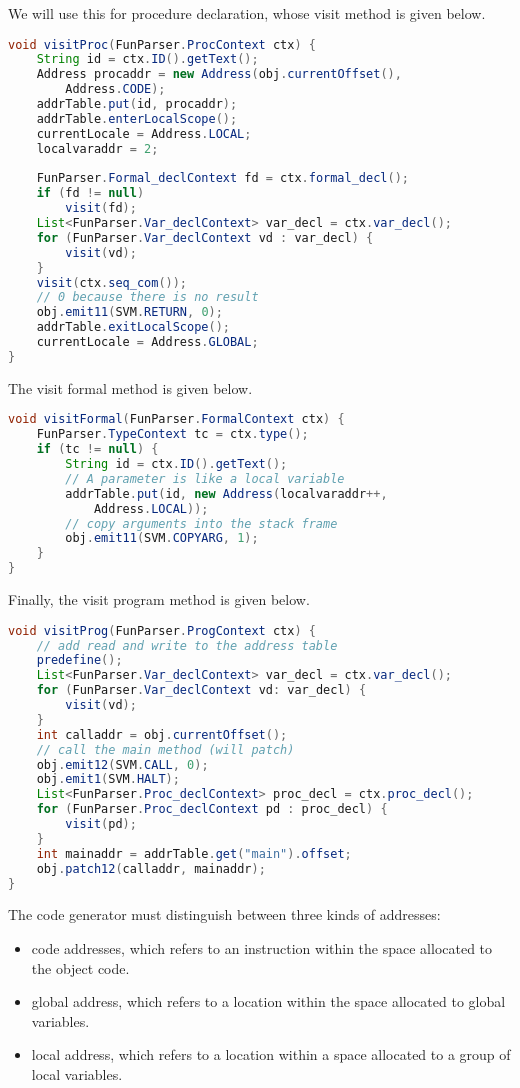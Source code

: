 \documentclass[a4paper, openany]{memoir}
\begin{document}
We will use this for procedure declaration, whose visit method is given below.
\begin{lstlisting}[language=java]
void visitProc(FunParser.ProcContext ctx) {
    String id = ctx.ID().getText();
    Address procaddr = new Address(obj.currentOffset(), 
        Address.CODE);
    addrTable.put(id, procaddr);
    addrTable.enterLocalScope();
    currentLocale = Address.LOCAL;
    localvaraddr = 2;
    
    FunParser.Formal_declContext fd = ctx.formal_decl();
    if (fd != null)
        visit(fd);
    List<FunParser.Var_declContext> var_decl = ctx.var_decl();
    for (FunParser.Var_declContext vd : var_decl) {
        visit(vd);
    }
    visit(ctx.seq_com());
    // 0 because there is no result
    obj.emit11(SVM.RETURN, 0);
    addrTable.exitLocalScope();
    currentLocale = Address.GLOBAL;
}
\end{lstlisting}

The visit formal method is given below.
\begin{lstlisting}[language=java]
void visitFormal(FunParser.FormalContext ctx) {
    FunParser.TypeContext tc = ctx.type();
    if (tc != null) {
        String id = ctx.ID().getText();
        // A parameter is like a local variable
        addrTable.put(id, new Address(localvaraddr++, 
            Address.LOCAL));
        // copy arguments into the stack frame
        obj.emit11(SVM.COPYARG, 1);
    }
}
\end{lstlisting}

Finally, the visit program method is given below.
\begin{lstlisting}[language=java]
void visitProg(FunParser.ProgContext ctx) {
    // add read and write to the address table
    predefine();
    List<FunParser.Var_declContext> var_decl = ctx.var_decl();
    for (FunParser.Var_declContext vd: var_decl) {
        visit(vd);
    }
    int calladdr = obj.currentOffset();
    // call the main method (will patch)
    obj.emit12(SVM.CALL, 0);
    obj.emit1(SVM.HALT);
    List<FunParser.Proc_declContext> proc_decl = ctx.proc_decl();
    for (FunParser.Proc_declContext pd : proc_decl) {
        visit(pd);
    }
    int mainaddr = addrTable.get("main").offset;
    obj.patch12(calladdr, mainaddr);
}
\end{lstlisting}

The code generator must distinguish between three kinds of addresses:
\begin{itemize}
    \item code addresses, which refers to an instruction within the space allocated to the object code.
    \item global address, which refers to a location within the space allocated to global variables.
    \item local address, which refers to a location within a space allocated to a group of local variables.
\end{itemize}
\end{document}
